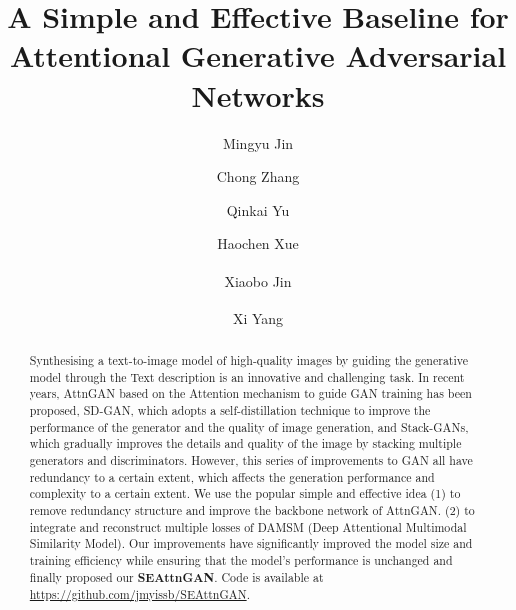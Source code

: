 \documentclass[runningheads, orivec]{llncs}
\begin{document}
\title{A Simple and Effective Baseline for Attentional Generative Adversarial Networks}

\author{
Mingyu Jin\and 
Chong Zhang\and
Qinkai Yu \and
Haochen Xue \and
Xiaobo Jin\textsuperscript{\Letter} \and
Xi Yang\textsuperscript{\Letter}
}
\vspace{-10pt}

\maketitle  %
\vspace{-15pt}

\begin{abstract}
Synthesising a text-to-image model of high-quality images by guiding the generative model through the Text description is an innovative and challenging task. In recent years, AttnGAN based on the Attention mechanism to guide GAN training has been proposed, SD-GAN, which adopts a self-distillation technique to improve the performance of the generator and the quality of image generation, and Stack-GANs, which gradually improves the details and quality of the image by stacking multiple generators and discriminators. However, this series of improvements to GAN all have redundancy to a certain extent, which affects the generation performance and complexity to a certain extent. We use the popular simple and effective idea (1) to remove redundancy structure and improve the backbone network of AttnGAN. (2) to integrate and reconstruct multiple losses of DAMSM (Deep Attentional Multimodal Similarity Model). Our improvements have significantly improved the model size and training efficiency while ensuring that the model's performance is unchanged and finally proposed our \textbf{SEAttnGAN}. Code is available at \href{https://github.com/jmyissb/SEAttnGAN}{https://github.com/jmyissb/SEAttnGAN}.

\end{abstract}
\end{document}

